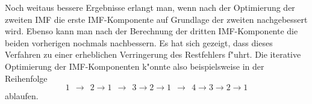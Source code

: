 \documentclass[a4paper]{scrartcl}
\begin{document}
Noch weitaus bessere Ergebnisse erlangt man, wenn nach der Optimierung der zweiten IMF die erste IMF-Komponente auf Grundlage der zweiten nachgebessert wird. 
Ebenso kann man nach der Berechnung der dritten IMF-Komponente die beiden vorherigen nochmals nachbessern.
Es hat sich gezeigt, dass dieses Verfahren zu einer erheblichen Verringerung des Restfehlers f"uhrt. 
Die iterative Optimierung der IMF-Komponenten k"onnte also beispielsweise in der Reihenfolge 
$$ 1 
\ \ \longrightarrow \ \ 2
\rightarrow 1 
\ \ \longrightarrow \ \ 3
\rightarrow 2
\rightarrow 1 
\ \ \longrightarrow \ \ 4
\rightarrow 3
\rightarrow 2
\rightarrow 1 $$
ablaufen. 





\end{document}
